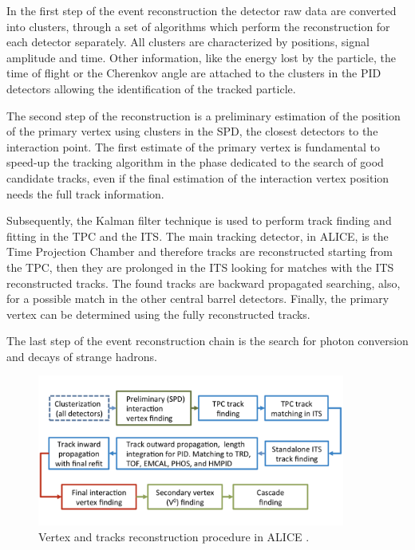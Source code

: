 In the first step of the event reconstruction the detector raw data are converted into clusters, 
through a set of algorithms which perform the reconstruction for each detector separately.
All clusters are characterized by positions, signal amplitude and time.
Other information, like the energy lost by the particle, the time of flight or the Cherenkov 
angle are attached to the clusters in the PID detectors allowing the identification of the 
tracked particle.

The second step of the reconstruction is a preliminary estimation of the position of the primary
vertex using clusters in the SPD, the closest detectors to the interaction point.
The first estimate of the primary vertex is fundamental to speed-up the tracking algorithm in the phase dedicated to the search of good candidate tracks, even if the final estimation of the interaction vertex position 
needs the full track information.

Subsequently, the Kalman filter technique \cite{kalman} is used to perform track finding and
fitting in the TPC and the ITS. 
The main tracking detector, in ALICE, is the Time Projection Chamber and therefore tracks are reconstructed 
starting from the TPC, then they are prolonged in the ITS looking for matches with the ITS 
reconstructed tracks. 
The found tracks are backward propagated searching, also, for a possible match in the other central
barrel detectors.
Finally, the primary vertex can be determined using the fully reconstructed tracks.

The last step of the event reconstruction chain is the search for photon conversion and decays of
strange hadrons.

\begin{figure}
    \captionsetup{justification=centering}
    \centering
    \includegraphics[width=0.9\textwidth]{gfx/reconstruction}
	\caption{Vertex and tracks reconstruction procedure in ALICE \cite{alice:Perf2014}.}
	\label{fig:rec_flow}
\end{figure}

